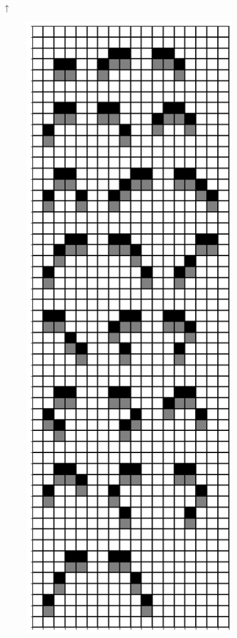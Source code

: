 \documentclass[12pt]{article}
\numberwithin{figure}{section} %
\begin{document}
\begin{figure}[H]
\begin{center}
{\Huge$\uparrow$}
\end{center}
 \begin{subfigure}{0.49\textwidth}
     \centering
     \includegraphics[width=\linewidth]{Section4/1.0}

\end{subfigure}
\end{figure}
\end{document}
